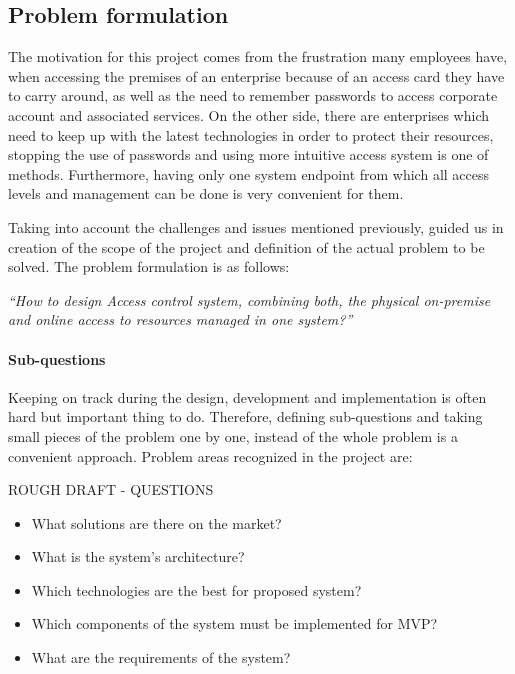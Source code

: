 \subsection{Problem formulation} \label{problemFormulation}
The motivation for this project comes from the frustration many employees have, when accessing the premises of an enterprise because of an access card they have to carry around, as well as the need to remember passwords to access corporate account and associated services.
On the other side, there are enterprises which need to keep up with the latest technologies in order to protect their resources, stopping the use of passwords and using more intuitive access system is one of methods. Furthermore, having only one system endpoint from which all access levels and management can be done is very convenient for them.

Taking into account the challenges and issues mentioned previously, guided us in creation of the scope of the project and definition of the actual problem to be solved. The problem formulation is as follows:

\begin{center}
    \textit{“How to design Access control system, combining both, the physical on-premise and online access to resources managed in one system?”}
\end{center}

\paragraph{Sub-questions}
Keeping on track during the design, development and implementation is often hard but important thing to do. Therefore, defining sub-questions and taking small pieces of the problem one by one, instead of the whole problem is a convenient approach. Problem areas recognized in the project are:

ROUGH DRAFT - QUESTIONS
\begin{itemize}[noitemsep]
    \item What solutions are there on the market?
    \item What is the system’s architecture?
    \item Which technologies are the best for proposed system?
    \item Which components of the system must be implemented for MVP?
    \item What are the requirements of the system?
\end{itemize}